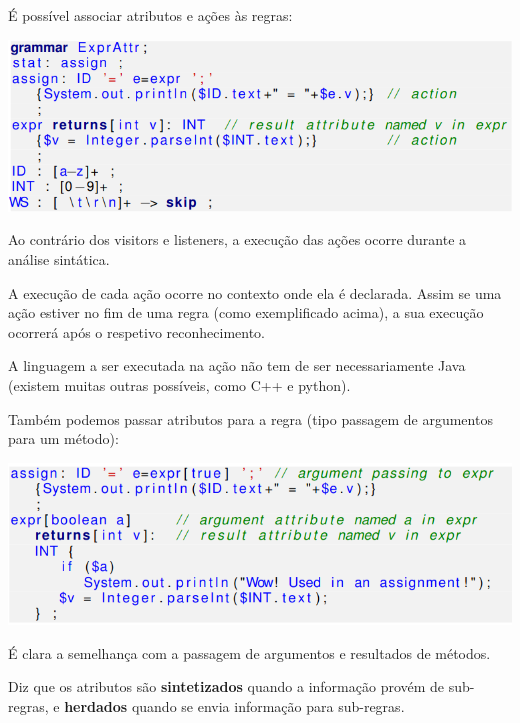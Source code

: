 \documentclass{article}
\begin{document}
\begin{flushleft}
  \item É possível associar atributos e ações às regras:

  \begin{center}
    \includegraphics[scale=0.3]{31}
  \end{center}

  \item Ao contrário dos visitors e listeners, a execução das
  ações ocorre durante a análise sintática.
  \item A execução de cada ação ocorre no contexto onde ela é
  declarada. Assim se uma ação estiver no fim de uma
  regra (como exemplificado acima), a sua execução
  ocorrerá após o respetivo reconhecimento.
  \item A linguagem a ser executada na ação não tem de ser
  necessariamente Java (existem muitas outras possíveis,
  como C++ e python).
  \item Também podemos passar atributos para a regra (tipo
  passagem de argumentos para um método):

  \begin{center}
    \includegraphics[scale=0.3]{32}
  \end{center}

  \item É clara a semelhança com a passagem de argumentos e
  resultados de métodos.
  \item Diz que os atributos são \textbf{sintetizados} quando a informação
  provém de sub-regras, e \textbf{herdados} quando se envia
  informação para sub-regras.
\end{flushleft}
\end{document}
